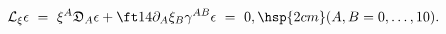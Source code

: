 \begin{equation}
\mathcal{L}_\xi \epsilon\ =\ \xi^A \mathfrak{D}_A \epsilon 
               + \ft14 \partial_A \xi_B \gamma^{AB} \epsilon \ = \ 0,
\hsp{2cm}
(A,B=0,\dots,10).
\end{equation}

